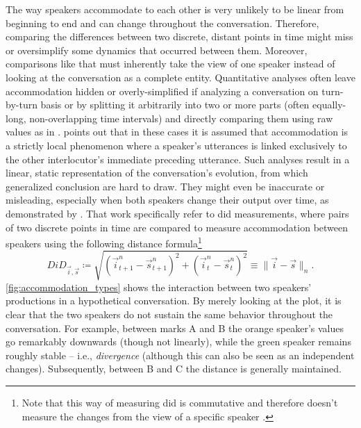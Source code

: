 The way speakers accommodate to each other is very unlikely to be linear from beginning to end and can change throughout the conversation.
Therefore, comparing the differences between two discrete, distant points in time might miss or oversimplify some dynamics that occurred between them.
Moreover, comparisons like that must inherently take the view of one speaker instead of looking at the conversation as a complete entity.
Quantitative analyses often leave accommodation hidden or overly-simplified if analyzing a conversation on turn-by-turn basis or by splitting it arbitrarily into two or more parts (often equally-long, non-overlapping time intervals) and directly comparing them using raw values as in \citet{Heldner2010pitch, Rahimi2018weighting, Ibrahim2019fundamental}.
\citet[][p.~15]{DeLooze2014investigating} points out that in these cases it is assumed that accommodation is a strictly local phenomenon where a speaker's utterances is linked exclusively to the other interlocutor's immediate preceding utterance.
Such analyses result in a linear, static representation of the conversation's evolution, from which generalized conclusion are hard to draw.
They might even be inaccurate or misleading, especially when both speakers change their output over time, as demonstrated by \citet{CohenPriva2019limitations}.
That work specifically refer to \ac{did} measurements, where pairs of two discrete points in time are compared to measure accommodation between speakers using the following distance formula\footnote{Note that this way of measuring \ac{did} is commutative and therefore doesn't measure the changes from the view of a specific speaker \citep[unlike,~e.g.,][p.~3]{CohenPriva2019limitations}.}
%
\begin{equation}
	\label{eq:did}
	DiD_{\vec{i},\vec{s}} \coloneqq \sqrt{(\vec{i}_{t + 1}^n - \vec{s}_{t + 1}^n)^2 + (\vec{i}_t^n - \vec{s}_t^n)^2} \equiv \lVert \vec{i} - \vec{s} \rVert_n.
\end{equation}
\noindent
%
\cref{fig:accommodation_types} shows the interaction between two speakers' productions in a hypothetical conversation.
By merely looking at the plot, it is clear that the two speakers do not sustain the same behavior throughout the conversation.
For example, between marks A and B the orange speaker's values go remarkably downwards (though not linearly), while the green speaker remains roughly stable -- i.e., \emph{divergence} (although this can also be seen as an independent changes).
Subsequently, between B and C the distance is generally maintained.
